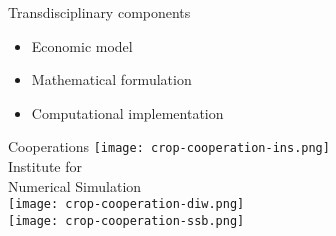   \begin{frame}{Transdisciplinary components}

  \begin{itemize}
  \item Economic model
  \item Mathematical formulation
  \item Computational implementation
  \end{itemize}
  \end{frame}
  \begin{frame}{Cooperations}
  	\centering   \vspace{0.25cm}
  	\texttt{[image: crop-cooperation-ins.png]} \\\vspace{-0.5cm}
  	\footnotesize{Institute for \\ Numerical Simulation}\vspace{0.3cm}   \\ \vspace{0.4cm}
  	\texttt{[image: crop-cooperation-diw.png]} \\ \vspace{0.35cm}
  	\texttt{[image: crop-cooperation-ssb.png]} 
%  		
%  	
%  	
\end{frame}
